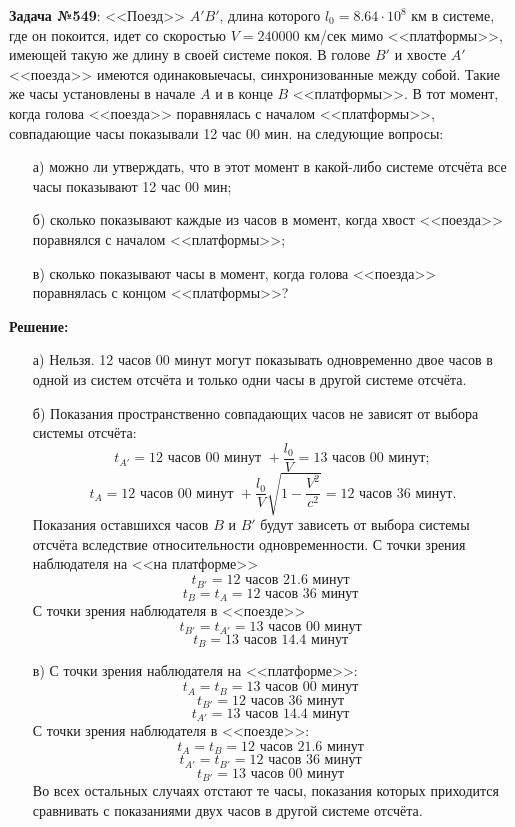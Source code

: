 \par\textbf{Задача №549}: <<Поезд>> \( A'B' \), длина которого \( l_0 = 8.64\cdot10^8 \) км в системе,
где он покоится, идет со скоростью \( V = 240000 \) км/сек мимо <<платформы>>, имеющей
такую же длину в своей системе покоя. В голове \( B' \) и хвосте \( A' \) <<поезда>> 
имеются одинаковыечасы, синхронизованные между собой. Такие же часы установлены в 
начале \( A \) и в конце \( B \) <<платформы>>. В тот момент, когда голова <<поезда>> 
поравнялась с началом <<платформы>>, совпадающие часы показывали 12 час 00 мин.
 на следующие вопросы:
\begin{itemize}\itemsep-8pt
    \item[а)] можно ли утверждать, что в этот момент в какой-либо системе отсчёта все
            часы показывают 12 час 00 мин;
    \item[б)] сколько показывают каждые из часов в момент, когда хвост <<поезда>>
            поравнялся с началом <<платформы>>;
    \item[в)] сколько показывают часы в момент, когда голова <<поезда>> поравнялась
            с концом <<платформы>>?
\end{itemize}
\textbf{Решение:}
\begin{itemize}\itemsep-8pt
    \item[а)] Нельзя. 12 часов 00 минут могут показывать одновременно двое часов
            в одной из систем отсчёта и только одни часы в другой системе отсчёта.
    \item[б)] Показания пространственно совпадающих часов не зависят от выбора 
            системы отсчёта: 
            \[ t_{A'} = 12 \text{ часов } 00 \text{ минут } 
               + \frac{l_0}{V} = 13 \text{ часов } 00 \text{ минут}; \]
            \[ t_{A} = 12 \text{ часов } 00 \text{ минут } + \frac{l_0}{V}
            \sqrt{1-\frac{V^2}{c^2}} = 12 \text{ часов } 36 \text{ минут}. \]
            Показания оставшихся часов \( B \) и \( B' \) будут зависеть от выбора
            системы отсчёта вследствие относительности одновременности.
            С точки зрения наблюдателя на <<на платформе>>
            \[ t_{B'} = 12 \text{ часов } 21.6 \text{ минут } \]
            \[ t_{B} = t_{A} = 12 \text{ часов } 36 \text{ минут } \]
            С точки зрения наблюдателя в <<поезде>>
            \[ t_{B'} = t_{A'} = 13 \text{ часов } 00 \text{ минут } \]
            \[ t_{B} = 13 \text{ часов } 14.4 \text{ минут } \]
    \item[в)] С точки зрения наблюдателя на <<платформе>>:
            \[ t_A = t_B = 13 \text{ часов } 00 \text{ минут } \]
            \[ t_{B'} = 12 \text{ часов } 36 \text{ минут } \]
            \[ t_{A'} = 13 \text{ часов } 14.4 \text{ минут } \]
            С точки зрения наблюдателя в <<поезде>>:
            \[ t_A = t_B = 12 \text{ часов } 21.6 \text{ минут } \]
            \[ t_{A'} = t_{B'} = 12 \text{ часов } 36 \text{ минут } \]
            \[ t_{B'} = 13 \text{ часов } 00 \text{ минут } \]
            Во всех остальных случаях отстают те часы, показания которых 
            приходится сравнивать с показаниями двух часов в другой системе отсчёта.
\end{itemize}

